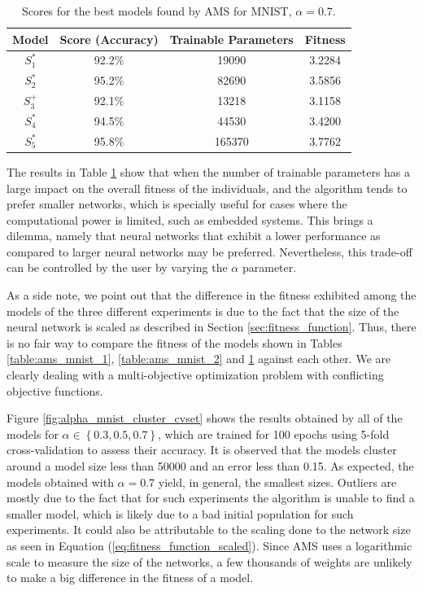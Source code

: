 \documentclass[preprint,12pt]{elsarticle}%
\begin{document}
\vspace{-2em}

\begin{table}[H]
\begin{center}
\begin{tabular}{| c | c | c | c |}
\hline
Model & Score (Accuracy) & Trainable Parameters & Fitness\\
\hline
$S^*_1$ & 92.2\% & 19090 & 3.2284\\
$S^*_2$ & 95.2\% & 82690 & 3.5856\\
$S^+_3$ & 92.1\% & 13218 & 3.1158\\
$S^*_4$ & 94.5\% & 44530 & 3.4200\\
$S^*_5$ & 95.8\% & 165370 & 3.7762\\
\hline
\end{tabular}
\end{center}
\caption{Scores for the best models found by AMS for MNIST, $\alpha = 0.7$.}
\label{table:ams_mnist_3}
\end{table}

The results in Table \ref{table:ams_mnist_3} show that when the number of trainable parameters has a large impact on the overall fitness of the individuals, and the algorithm tends to prefer smaller networks, which is specially useful for cases where the computational power is limited, such as embedded systems. This brings a dilemma, namely that neural networks that exhibit a lower performance as compared to larger neural networks may be preferred. Nevertheless, this trade-off can be controlled by the user by varying the $\alpha$ parameter. 

As a side note, we point out that the difference in the fitness exhibited among the models of the three different experiments is due to the fact that the size of the neural network is scaled as described in Section \ref{sec:fitness_function}. Thus, there is no fair way to compare the fitness of the models shown in Tables \ref{table:ams_mnist_1}, \ref{table:ams_mnist_2} and \ref{table:ams_mnist_3} against each other. We are clearly dealing with a multi-objective optimization problem with conflicting objective functions.

Figure \ref{fig:alpha_mnist_cluster_cvset} shows the results obtained by all of the models for $\alpha \in \left\lbrace 0.3, 0.5, 0.7  \right\rbrace$, which are trained for 100 epochs using 5-fold cross-validation to assess their accuracy. It is observed that the models cluster around a model size less than 50000 and an error less than 0.15. As expected, the models obtained with $\alpha = 0.7$ yield, in general, the smallest sizes. Outliers are mostly due to the fact that for such experiments the algorithm is unable to find a smaller model, which is likely due to a bad initial population for such experiments. It could also be attributable to the scaling done to the network size as seen in Equation  (\ref{eq:fitness_function_scaled}). Since AMS uses a logarithmic scale to measure the size of the networks, a few thousands of weights are unlikely to make a big difference in the fitness of a model. 
\end{document}
